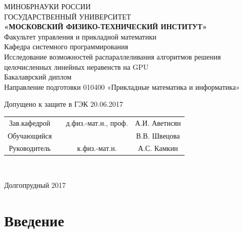 \documentclass[a4paper,14pt,russian]{extreport}
\begin{document}
\begin{center}
\hfill \break
\large{МИНОБРНАУКИ РОССИИ}\\
\footnotesize{ГОСУДАРСТВЕННЫЙ УНИВЕРСИТЕТ}\\ 
\small{\textbf{«МОСКОВСКИЙ ФИЗИКО-ТЕХНИЧЕСКИЙ ИНСТИТУТ»}}\\
\normalsize{Факультет управления и прикладной математики}\\
\normalsize{Кафедра системного программирования}\\
\hfill\break
\hfill \break
\hfill \break
\large{Исследование возможностей распараллеливания алгоритмов решения целочисленных линейных неравенств на GPU}\\
\hfill \break
\hfill \break
\hfill \break
\normalsize{Бакалаврский диплом\\
\hfill \break
Направление подготовки 010400 «Прикладные математика и информатика»}\\
\hfill \break
\hfill \break
\end{center}
 
\normalsize{ \hspace{28pt} Допущено к защите в ГЭК  20.06.2017} \hfill \break
\hfill \break
 
\normalsize{ 
\begin{tabular}{cccc}
Зав.кафедрой & \underline{\hspace{3cm}} &  д.физ.-мат.н.,  проф. & А.И. Аветисян \\
Обучающийся & \underline{\hspace{3cm}} & & В.В. Швецова \\
Руководитель & \underline{\hspace{3cm}}& к.физ.-мат.н.&  А.С. Камкин \\
\end{tabular}
}\\
\hfill \break
\hfill \break
\begin{center} Долгопрудный 2017 \end{center}
\thispagestyle{empty} %
 
 
\newpage
     
    \tableofcontents %
\newpage
 
\newpage


\chapter{Введение}
\end{document}

